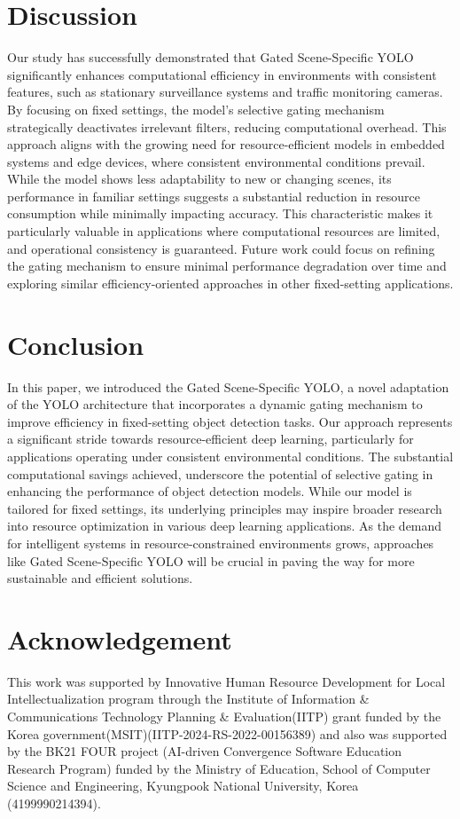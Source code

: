 \documentclass[runningheads]{llncs}
\begin{document}
\section{Discussion}
\label{sec:discussion}
Our study has successfully demonstrated that Gated Scene-Specific YOLO significantly enhances computational efficiency in environments with consistent features, such as stationary surveillance systems and traffic monitoring cameras. By focusing on fixed settings, the model's selective gating mechanism strategically deactivates irrelevant filters, reducing computational overhead. This approach aligns with the growing need for resource-efficient models in embedded systems and edge devices, where consistent environmental conditions prevail. While the model shows less adaptability to new or changing scenes, its performance in familiar settings suggests a substantial reduction in resource consumption while minimally impacting accuracy. This characteristic makes it particularly valuable in applications where computational resources are limited, and operational consistency is guaranteed. Future work could focus on refining the gating mechanism to ensure minimal performance degradation over time and exploring similar efficiency-oriented approaches in other fixed-setting applications.

\section{Conclusion}
\label{sec:conclusion}
In this paper, we introduced the Gated Scene-Specific YOLO, a novel adaptation of the YOLO architecture that incorporates a dynamic gating mechanism to improve efficiency in fixed-setting object detection tasks. Our approach represents a significant stride towards resource-efficient deep learning, particularly for applications operating under consistent environmental conditions. The substantial computational savings achieved, underscore the potential of selective gating in enhancing the performance of object detection models. While our model is tailored for fixed settings, its underlying principles may inspire broader research into resource optimization in various deep learning applications. As the demand for intelligent systems in resource-constrained environments grows, approaches like Gated Scene-Specific YOLO will be crucial in paving the way for more sustainable and efficient solutions.

\section{Acknowledgement}
\label{sec:acknowledgement}
This work was supported by Innovative Human Resource Development for Local Intellectualization program through the Institute of Information \& Communications Technology Planning \& Evaluation(IITP) grant funded by the Korea government(MSIT)(IITP-2024-RS-2022-00156389) and also was supported by the BK21 FOUR project (AI-driven Convergence Software Education Research Program) funded by the Ministry of Education, School of Computer Science and Engineering, Kyungpook National University, Korea (4199990214394).



\end{document}
